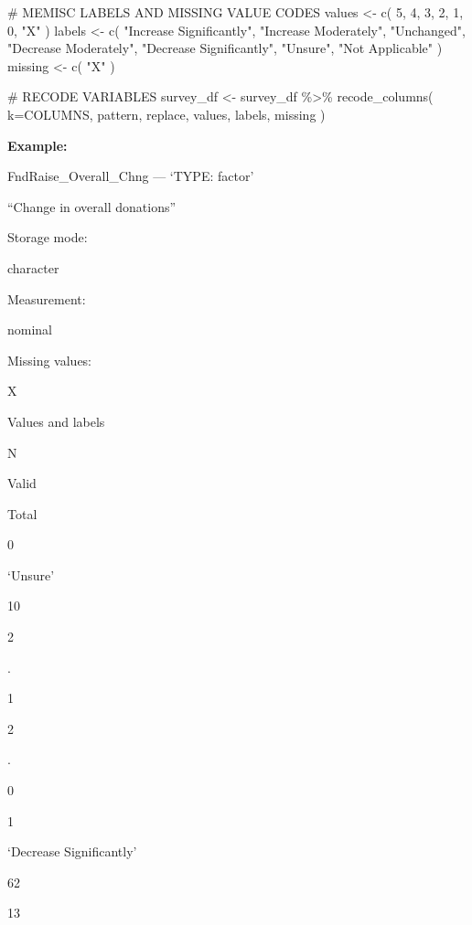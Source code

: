 \documentclass[
  letterpaper,
]{scrbook}
\newenvironment{Shaded}{\begin{snugshade}}{\end{snugshade}}
\newcommand{\AttributeTok}[1]{\textcolor[rgb]{0.40,0.45,0.13}{#1}}
\newcommand{\CommentTok}[1]{\textcolor[rgb]{0.37,0.37,0.37}{#1}}
\newcommand{\DecValTok}[1]{\textcolor[rgb]{0.68,0.00,0.00}{#1}}
\newcommand{\FunctionTok}[1]{\textcolor[rgb]{0.28,0.35,0.67}{#1}}
\newcommand{\NormalTok}[1]{\textcolor[rgb]{0.00,0.23,0.31}{#1}}
\newcommand{\OtherTok}[1]{\textcolor[rgb]{0.00,0.23,0.31}{#1}}
\newcommand{\SpecialCharTok}[1]{\textcolor[rgb]{0.37,0.37,0.37}{#1}}
\newcommand{\StringTok}[1]{\textcolor[rgb]{0.13,0.47,0.30}{#1}}
\begin{document}
\begin{Shaded}
\begin{Highlighting}[]
\CommentTok{\# MEMISC LABELS AND MISSING VALUE CODES }
\NormalTok{values  }\OtherTok{\textless{}{-}} \FunctionTok{c}\NormalTok{( }\DecValTok{5}\NormalTok{, }\DecValTok{4}\NormalTok{, }\DecValTok{3}\NormalTok{, }\DecValTok{2}\NormalTok{, }\DecValTok{1}\NormalTok{, }\DecValTok{0}\NormalTok{, }\StringTok{"X"}\NormalTok{  )}
\NormalTok{labels  }\OtherTok{\textless{}{-}} \FunctionTok{c}\NormalTok{( }\StringTok{"Increase Significantly"}\NormalTok{, }\StringTok{"Increase Moderately"}\NormalTok{, }
              \StringTok{"Unchanged"}\NormalTok{, }\StringTok{"Decrease Moderately"}\NormalTok{, }\StringTok{"Decrease Significantly"}\NormalTok{, }
              \StringTok{"Unsure"}\NormalTok{, }\StringTok{"Not Applicable"}\NormalTok{ )}
\NormalTok{missing }\OtherTok{\textless{}{-}} \FunctionTok{c}\NormalTok{( }\StringTok{"X"}\NormalTok{ )}

\CommentTok{\# RECODE VARIABLES }
\NormalTok{survey\_df }\OtherTok{\textless{}{-}} 
\NormalTok{  survey\_df }\SpecialCharTok{\%\textgreater{}\%} 
  \FunctionTok{recode\_columns}\NormalTok{( }\AttributeTok{k=}\NormalTok{COLUMNS, pattern, replace, values, labels, missing )}
\end{Highlighting}
\end{Shaded}

\textbf{Example:}

FndRaise\_Overall\_Chng --- {`TYPE: factor'}

``Change in overall donations''

Storage mode:

character

Measurement:

nominal

Missing values:

X

Values and labels

N

Valid

Total

0

`Unsure'

10

2

.

1

2

.

0

1

`Decrease Significantly'

62

13
\end{document}
